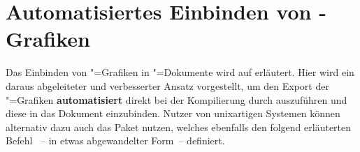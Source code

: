 \section{Automatisiertes Einbinden von -Grafiken }
%
%
%
Das Einbinden von "=Grafiken in "=Dokumente
wird auf  erläutert. Hier 
wird ein daraus abgeleiteter und verbesserter Ansatz vorgestellt, um den Export 
der "=Grafiken \textbf{automatisiert} direkt bei der 
Kompilierung durch  auszuführen und diese in das Dokument 
einzubinden. Nutzer von unixartigen Systemen können alternativ dazu auch das 
Paket  nutzen, welches ebenfalls den folgend erläuterten Befehl 
~-- in etwas abgewandelter Form~-- definiert.

